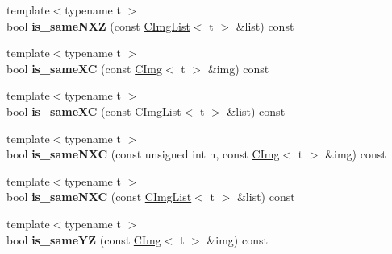 \begin{DoxyCompactItemize}
\item 
\hypertarget{structcimg__library_1_1CImgList_a6c454140a06fe23cdae4f9e40c1dcb23}{
{\footnotesize template$<$typename t $>$ }\\bool {\bfseries is\_\-sameNXZ} (const \hyperlink{structcimg__library_1_1CImgList}{CImgList}$<$ t $>$ \&list) const }
\label{structcimg__library_1_1CImgList_a6c454140a06fe23cdae4f9e40c1dcb23}

\item 
\hypertarget{structcimg__library_1_1CImgList_a65a2c91e672f559e7217b1ca8bc82f21}{
{\footnotesize template$<$typename t $>$ }\\bool {\bfseries is\_\-sameXC} (const \hyperlink{structcimg__library_1_1CImg}{CImg}$<$ t $>$ \&img) const }
\label{structcimg__library_1_1CImgList_a65a2c91e672f559e7217b1ca8bc82f21}

\item 
\hypertarget{structcimg__library_1_1CImgList_a15d757c37cce7dc247fcd81362735795}{
{\footnotesize template$<$typename t $>$ }\\bool {\bfseries is\_\-sameXC} (const \hyperlink{structcimg__library_1_1CImgList}{CImgList}$<$ t $>$ \&list) const }
\label{structcimg__library_1_1CImgList_a15d757c37cce7dc247fcd81362735795}

\item 
\hypertarget{structcimg__library_1_1CImgList_ab134ff21fed807ee56d03b6917a44394}{
{\footnotesize template$<$typename t $>$ }\\bool {\bfseries is\_\-sameNXC} (const unsigned int n, const \hyperlink{structcimg__library_1_1CImg}{CImg}$<$ t $>$ \&img) const }
\label{structcimg__library_1_1CImgList_ab134ff21fed807ee56d03b6917a44394}

\item 
\hypertarget{structcimg__library_1_1CImgList_a1d86605180510afe1d4541dabcec0c56}{
{\footnotesize template$<$typename t $>$ }\\bool {\bfseries is\_\-sameNXC} (const \hyperlink{structcimg__library_1_1CImgList}{CImgList}$<$ t $>$ \&list) const }
\label{structcimg__library_1_1CImgList_a1d86605180510afe1d4541dabcec0c56}

\item 
\hypertarget{structcimg__library_1_1CImgList_a5d863be6ae8d5d8ab0af39aa78174b2f}{
{\footnotesize template$<$typename t $>$ }\\bool {\bfseries is\_\-sameYZ} (const \hyperlink{structcimg__library_1_1CImg}{CImg}$<$ t $>$ \&img) const }
\label{structcimg__library_1_1CImgList_a5d863be6ae8d5d8ab0af39aa78174b2f}


\end{DoxyCompactItemize}
